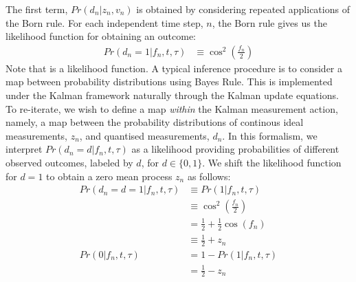The first term, $Pr(d_n | z_n, v_n)$ is obtained by considering repeated applications of the Born rule. For each independent time step, $n$, the Born rule gives us the likelihood function for obtaining an outcome:
\begin{align}
Pr(d_n=1 | f_n, t, \tau) & \equiv \cos^2(\frac{f_n}{2}) 
\end{align}
Note that is a likelihood function. A typical inference procedure is to consider a map between probability distributions using Bayes Rule. This is implemented under the Kalman framework naturally through the Kalman update equations. To re-iterate, we wish to define a map \emph{within} the Kalman measurement action, namely, a map between the probability distributions of continous ideal measurements, $z_n$, and quantised measurements, $d_n$. In this formalism, we interpret $Pr(d_n=d | f_n, t, \tau)$ as a likelihood providing probabilities of different observed outcomes, labeled by $d$, for $d \in \{0, 1\}$. We shift the likelihood function for $d=1$ to obtain a zero mean process $z_n$ as follows: 
\begin{align} 
Pr(d_n=d=1 | f_n, t, \tau) &\equiv Pr(1 | f_n, t, \tau)\\
 & \equiv \cos^2(\frac{f_n}{2}) \\
& = \frac{1}{2} +  \frac{1}{2}\cos(f_n) \\
& \equiv \frac{1}{2} +  z_n  \\
Pr(0 | f_n, t, \tau) & = 1 - Pr(1 | f_n, t, \tau)\\
& = \frac{1}{2} - z_n \label{eqn:app:bornrule:up}
\end{align}

